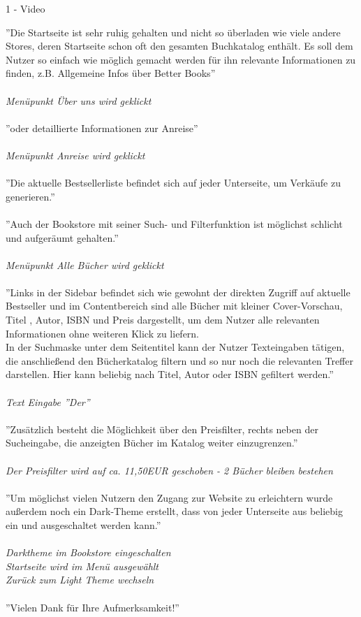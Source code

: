 \documentclass[a4paper]{article}
\begin{document}
\begin{exercise}{1 - Video}
\begin{itemize}
''Die Startseite ist sehr ruhig gehalten und nicht so überladen wie viele andere Stores, deren Startseite schon oft den gesamten Buchkatalog enthält. Es soll dem Nutzer so einfach wie möglich gemacht werden für ihn relevante Informationen zu finden, z.B. Allgemeine Infos über Better Books''\\\\
\textit{Menüpunkt Über uns wird geklickt}\\\\
''oder detaillierte Informationen zur Anreise''\\\\
\textit{Menüpunkt Anreise wird geklickt}\\\\
''Die aktuelle Bestsellerliste befindet sich auf jeder Unterseite, um Verkäufe zu generieren.''\\\\
''Auch der Bookstore mit seiner Such- und Filterfunktion ist möglichst schlicht und aufgeräumt gehalten.''\\\\
\textit{Menüpunkt Alle Bücher wird geklickt}\\\\
''Links in der Sidebar befindet sich wie gewohnt der direkten Zugriff auf aktuelle Bestseller und im Contentbereich sind alle Bücher mit kleiner Cover-Vorschau, Titel , Autor, ISBN und Preis dargestellt, um dem Nutzer alle relevanten Informationen ohne weiteren Klick zu liefern.\\
In der Suchmaske unter dem Seitentitel kann der Nutzer Texteingaben tätigen, die anschließend den Bücherkatalog filtern und so nur noch die relevanten Treffer darstellen. Hier kann beliebig nach Titel, Autor oder ISBN gefiltert werden.''\\\\
\textit{Text Eingabe ''Der'' }\\\\
''Zusätzlich besteht die Möglichkeit über den Preisfilter, rechts neben der Sucheingabe, die anzeigten Bücher im Katalog weiter einzugrenzen.''\\\\
\textit{Der Preisfilter wird auf ca. 11,50EUR geschoben - 2 Bücher bleiben bestehen }\\\\
''Um möglichst vielen Nutzern den Zugang zur Website zu erleichtern wurde außerdem noch ein Dark-Theme erstellt, dass von jeder Unterseite aus beliebig ein und ausgeschaltet werden kann.''\\\\
\textit{Darktheme im Bookstore eingeschalten}\\
\textit{Startseite wird im Menü ausgewählt}\\
\textit{Zurück zum Light Theme wechseln}\\\\
''Vielen Dank für Ihre Aufmerksamkeit!''
\end{itemize}
\end{exercise}
\end{document}
